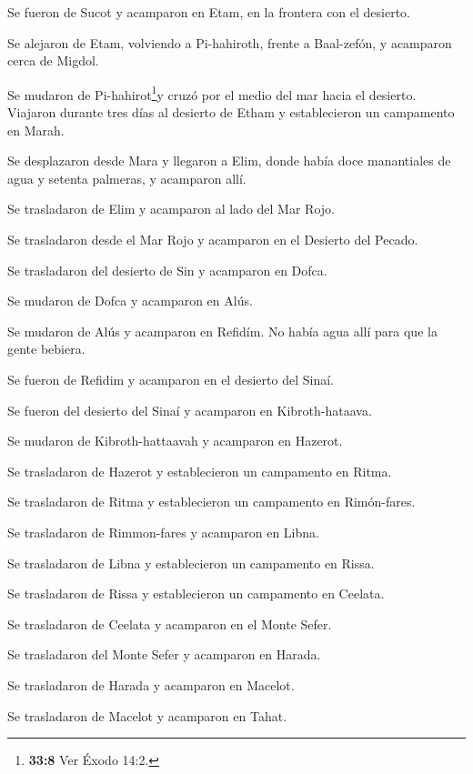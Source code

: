  Se fueron de Sucot y acamparon en Etam, en la frontera con
el desierto.

 Se alejaron de Etam, volviendo a Pi-hahiroth, frente a
Baal-zefón, y acamparon cerca de Migdol.

 Se mudaron de Pi-hahirot\footnote{\textbf{33:8} Ver Éxodo
  14:2.}y cruzó por el medio del mar hacia el desierto. Viajaron durante
tres días al desierto de Etham y establecieron un campamento en Marah.

 Se desplazaron desde Mara y llegaron a Elim, donde había
doce manantiales de agua y setenta palmeras, y acamparon allí.

 Se trasladaron de Elim y acamparon al lado del Mar Rojo.

 Se trasladaron desde el Mar Rojo y acamparon en el
Desierto del Pecado.

 Se trasladaron del desierto de Sin y acamparon en Dofca.

 Se mudaron de Dofca y acamparon en Alús.

 Se mudaron de Alús y acamparon en Refidím. No había agua
allí para que la gente bebiera.

 Se fueron de Refidim y acamparon en el desierto del Sinaí.

 Se fueron del desierto del Sinaí y acamparon en
Kibroth-hataava.

 Se mudaron de Kibroth-hattaavah y acamparon en Hazerot.

 Se trasladaron de Hazerot y establecieron un campamento en
Ritma.

 Se trasladaron de Ritma y establecieron un campamento en
Rimón-fares.

 Se trasladaron de Rimmon-fares y acamparon en Libna.

 Se trasladaron de Libna y establecieron un campamento en
Rissa.

 Se trasladaron de Rissa y establecieron un campamento en
Ceelata.

 Se trasladaron de Ceelata y acamparon en el Monte Sefer.

 Se trasladaron del Monte Sefer y acamparon en Harada.

 Se trasladaron de Harada y acamparon en Macelot.

 Se trasladaron de Macelot y acamparon en Tahat.

